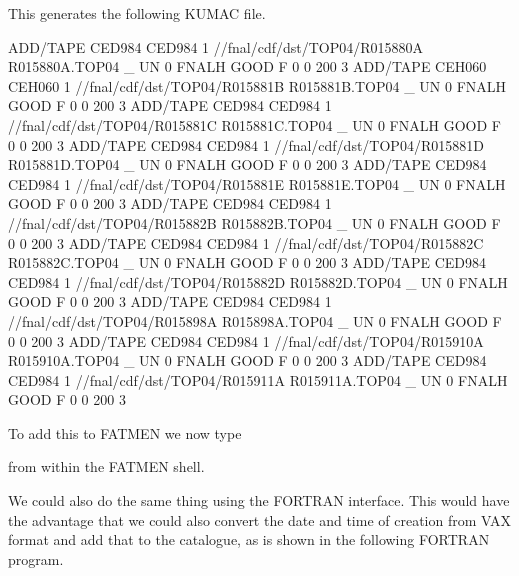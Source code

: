 This generates the following KUMAC file.
\begin{XMP}
ADD/TAPE CED984 CED984 1 //fnal/cdf/dst/TOP04/R015880A R015880A.TOP04 _
UN 0 FNALH GOOD F 0 0 200 3
ADD/TAPE CEH060 CEH060 1 //fnal/cdf/dst/TOP04/R015881B R015881B.TOP04 _
UN 0 FNALH GOOD F 0 0 200 3
ADD/TAPE CED984 CED984 1 //fnal/cdf/dst/TOP04/R015881C R015881C.TOP04 _
UN 0 FNALH GOOD F 0 0 200 3
ADD/TAPE CED984 CED984 1 //fnal/cdf/dst/TOP04/R015881D R015881D.TOP04 _
UN 0 FNALH GOOD F 0 0 200 3
ADD/TAPE CED984 CED984 1 //fnal/cdf/dst/TOP04/R015881E R015881E.TOP04 _
UN 0 FNALH GOOD F 0 0 200 3
ADD/TAPE CED984 CED984 1 //fnal/cdf/dst/TOP04/R015882B R015882B.TOP04 _
UN 0 FNALH GOOD F 0 0 200 3
ADD/TAPE CED984 CED984 1 //fnal/cdf/dst/TOP04/R015882C R015882C.TOP04 _
UN 0 FNALH GOOD F 0 0 200 3
ADD/TAPE CED984 CED984 1 //fnal/cdf/dst/TOP04/R015882D R015882D.TOP04 _
UN 0 FNALH GOOD F 0 0 200 3
ADD/TAPE CED984 CED984 1 //fnal/cdf/dst/TOP04/R015898A R015898A.TOP04 _
UN 0 FNALH GOOD F 0 0 200 3
ADD/TAPE CED984 CED984 1 //fnal/cdf/dst/TOP04/R015910A R015910A.TOP04 _
UN 0 FNALH GOOD F 0 0 200 3
ADD/TAPE CED984 CED984 1 //fnal/cdf/dst/TOP04/R015911A R015911A.TOP04 _
UN 0 FNALH GOOD F 0 0 200 3
\end{XMP}
To add this to FATMEN we now type
\begin{XMP}
\end{XMP}
from within the FATMEN shell.
\par
We could also do the same thing using the FORTRAN interface.
This would have the advantage that we could also convert
the date and time of creation from VAX format and add that
to the catalogue, as is shown in the following FORTRAN
program.
